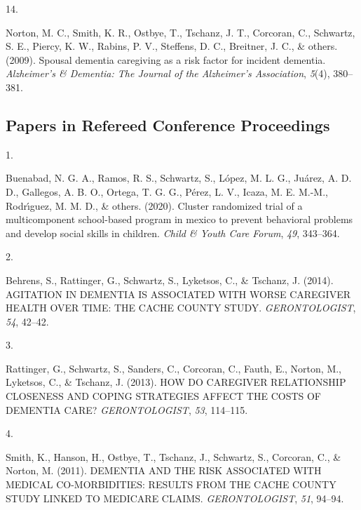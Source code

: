 \documentclass[11pt,a4paper,]{moderncv}
\newlength{\csllabelwidth}
\newcommand{\CSLLeftMargin}[1]{\parbox[t]{\csllabelwidth}{#1}}
\newcommand{\CSLRightInline}[1]{\parbox[t]{\linewidth - \csllabelwidth}{#1}}
\begin{document}
\leavevmode\hypertarget{ref-norton2009}{}%
\CSLLeftMargin{14. }
\CSLRightInline{Norton, M. C., Smith, K. R., Ostbye, T., Tschanz, J. T.,
Corcoran, C., Schwartz, S. E., Piercy, K. W., Rabins, P. V., Steffens,
D. C., Breitner, J. C., \& others. (2009). Spousal dementia caregiving
as a risk factor for incident dementia. \emph{Alzheimer's \& Dementia:
The Journal of the Alzheimer's Association}, \emph{5}(4), 380--381.}

\clearpage

\hypertarget{papers-in-refereed-conference-proceedings}{%
\subsection{\texorpdfstring{\textbf{Papers in Refereed Conference
Proceedings}}{Papers in Refereed Conference Proceedings}}\label{papers-in-refereed-conference-proceedings}}

\hypertarget{refs_proceedings}{}
\leavevmode\hypertarget{ref-buenabad2020cluster}{}%
\CSLLeftMargin{1. }
\CSLRightInline{Buenabad, N. G. A., Ramos, R. S., Schwartz, S., López,
M. L. G., Juárez, A. D. D., Gallegos, A. B. O., Ortega, T. G. G., Pérez,
L. V., Icaza, M. E. M.-M., Rodrı́guez, M. M. D., \& others. (2020).
Cluster randomized trial of a multicomponent school-based program in
mexico to prevent behavioral problems and develop social skills in
children. \emph{Child \& Youth Care Forum}, \emph{49}, 343--364.}

\leavevmode\hypertarget{ref-behrens2014agitation}{}%
\CSLLeftMargin{2. }
\CSLRightInline{Behrens, S., Rattinger, G., Schwartz, S., Lyketsos, C.,
\& Tschanz, J. (2014). AGITATION IN DEMENTIA IS ASSOCIATED WITH WORSE
CAREGIVER HEALTH OVER TIME: THE CACHE COUNTY STUDY.
\emph{GERONTOLOGIST}, \emph{54}, 42--42.}

\leavevmode\hypertarget{ref-rattinger2013caregiver}{}%
\CSLLeftMargin{3. }
\CSLRightInline{Rattinger, G., Schwartz, S., Sanders, C., Corcoran, C.,
Fauth, E., Norton, M., Lyketsos, C., \& Tschanz, J. (2013). HOW DO
CAREGIVER RELATIONSHIP CLOSENESS AND COPING STRATEGIES AFFECT THE COSTS
OF DEMENTIA CARE? \emph{GERONTOLOGIST}, \emph{53}, 114--115.}

\leavevmode\hypertarget{ref-smith2011dementia}{}%
\CSLLeftMargin{4. }
\CSLRightInline{Smith, K., Hanson, H., Ostbye, T., Tschanz, J.,
Schwartz, S., Corcoran, C., \& Norton, M. (2011). DEMENTIA AND THE RISK
ASSOCIATED WITH MEDICAL CO-MORBIDITIES: RESULTS FROM THE CACHE COUNTY
STUDY LINKED TO MEDICARE CLAIMS. \emph{GERONTOLOGIST}, \emph{51},
94--94.}
\end{document}
